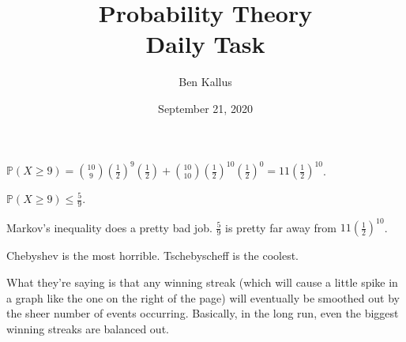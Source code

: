 \documentclass[12pt]{article}
\title{Probability Theory \\ Daily Task}
\author{Ben Kallus}
\date{September 21, 2020}
\begin{document}
\maketitle


    $\mathbb P(X \geq 9) = {10 \choose 9}(\frac12)^9(\frac12) + {10 \choose 10}(\frac12)^{10}(\frac12)^0 = 11(\frac12)^{10}$.


    $\mathbb P(X \geq 9) \leq \frac59$.
    

    Markov's inequality does a pretty bad job. $\frac59$ is pretty far away from $11(\frac12)^{10}$.
    

    Chebyshev is the most horrible. Tschebyscheff is the coolest.
    
\newpage


    What they're saying is that any winning streak (which will cause a little spike in a graph like the one on the right of the page) will eventually be smoothed out by the sheer number of events occurring. Basically, in the long run, even the biggest winning streaks are balanced out.
\end{document}
